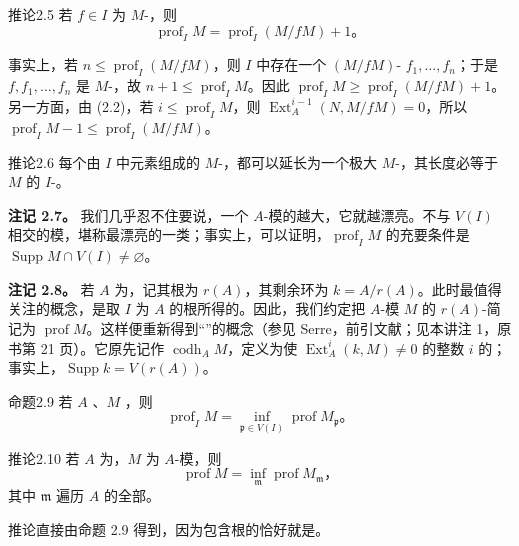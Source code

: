 \begin{SGAresult}{推论}{2.5}
若 $f\in I$ 为 $M$-，则
\[
\operatorname{prof}_IM=\operatorname{prof}_I(M/fM)+1。
\]
\end{SGAresult}
事实上，若 $n\le\operatorname{prof}_I(M/fM)$，则 $I$ 中存在一个 $(M/fM)$- $f_1,\ldots,f_n$；于是 $f,f_1,\ldots,f_n$ 是 $M$-，故 $n+1\le\operatorname{prof}_IM$。因此 $\operatorname{prof}_IM\ge\operatorname{prof}_I(M/fM)+1$。另一方面，由 (2.2)，若 $i\le\operatorname{prof}_IM$，则 $\operatorname{Ext}_A^{i-1}(N,M/fM)=0$，所以 $\operatorname{prof}_IM-1\le\operatorname{prof}_I(M/fM)$。
\begin{SGAresult}{推论}{2.6}
每个由 $I$ 中元素组成的 $M$-，都可以延长为一个极大 $M$-，其长度必等于 $M$ 的 $I$-。
\end{SGAresult}
\textbf{注记 2.7。}
我们几乎忍不住要说，一个 $A$-模的越大，它就越漂亮。不与 $V(I)$ 相交的模，堪称最漂亮的一类；事实上，可以证明，$\operatorname{prof}_IM$ 的充要条件是
$\operatorname{Supp}M\cap V(I)\ne\varnothing$。

\textbf{注记 2.8。}
若 $A$ 为，记其根为 $r(A)$，其剩余环为 $k=A/r(A)$。此时最值得关注的概念，是取 $I$ 为 $A$ 的根所得的。因此，我们约定把 $A$-模 $M$ 的 $r(A)$-简记为 $\operatorname{prof}M$。这样便重新得到“”的概念（参见 Serre，前引文献；见本讲注 1，原书第 21 页）。它原先记作 $\operatorname{codh}_AM$，定义为使 $\operatorname{Ext}_A^i(k,M)\ne0$ 的整数 $i$ 的；事实上，$\operatorname{Supp}k=V(r(A))$。
\begin{SGAresult}{命题}{2.9}
若 $A$ 、$M$ ，则
\[
\operatorname{prof}_IM=\inf_{\mathfrak p\in V(I)}
\operatorname{prof}M_{\mathfrak p}。
\]
\end{SGAresult}
\begin{SGAresult}{推论}{2.10}
若 $A$ 为，$M$ 为 $A$-模，则
\[
\operatorname{prof}M=\inf_{\mathfrak m}\operatorname{prof}M_{\mathfrak m}，
\]
其中 $\mathfrak m$ 遍历 $A$ 的全部。
\end{SGAresult}
推论直接由命题 2.9 得到，因为包含根的恰好就是。

